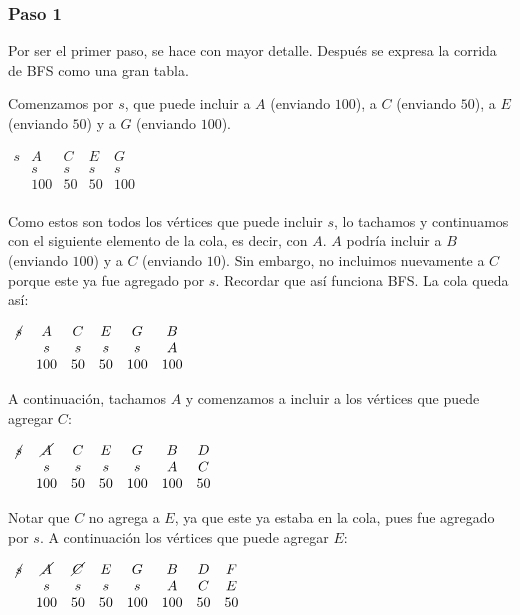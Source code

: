 \documentclass[10pt,a4paper]{article}
\begin{document}
\subsubsection*{Paso 1}

Por ser el primer paso, se hace con mayor detalle. Después se expresa la corrida de BFS como una gran tabla.

Comenzamos por $s$, que puede incluir a $A$ (enviando $100$), a $C$ (enviando $50$), a $E$ (enviando $50$) y a $G$ (enviando $100$).

$\begin{array}{ccccc} s & A & C & E &G \\ & s & s & s & s \\ & 100 & 50 & 50 & 100\\ \end{array}$

Como estos son todos los vértices que puede incluir $s$, lo tachamos y continuamos con el siguiente elemento de la cola, es decir, con $A$. $A$ podría incluir a $B$ (enviando $100$) y a $C$ (enviando $10$). Sin embargo, no incluimos nuevamente a $C$ porque este ya fue agregado por $s$. Recordar que así funciona BFS. La cola queda así:

$\begin{array}{cccccc} \cancel{s} & A & C & E &G & B \\ & s & s & s & s & A \\ & 100 & 50 & 50 & 100 & 100 \end{array}$

A continuación, tachamos $A$ y comenzamos a incluir a los vértices que puede agregar $C$:

$\begin{array}{ccccccc} \cancel{s} & \cancel{A} & C & E &G & B &D \\ & s & s & s & s & A &C\\ & 100 & 50 & 50 & 100 & 100&50\\ \end{array}$

Notar que $C$ no agrega a $E$, ya que este ya estaba en la cola, pues fue agregado por $s$. A continuación los vértices que puede agregar $E$:

$\begin{array}{cccccccc} \cancel{s} & \cancel{A} & \cancel{C} & E &G & B &D & F\\ & s & s & s & s & A &C &E\\ & 100 & 50 & 50 & 100 & 100&50 &50\\ \end{array}$
\end{document}
